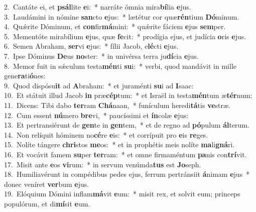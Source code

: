 {2.~}Cantáte ei, et \textbf{psál}lite \textbf{e}i:~* narráte ómnia mira\textbf{bí}lia \textbf{e}jus.\\
{3.~}Laudámini in nómine \textbf{san}cto \textbf{e}jus:~* lætétur cor quæ\textbf{rén}tium \textbf{Dó}minum.\\
{4.~}Quǽrite Dóminum, et \textbf{con}fir\textbf{má}mini:~* quǽrite fáciem \textbf{e}jus \textbf{sem}per.\\
{5.~}Mementóte mirabílium \textbf{e}jus, quæ \textbf{fe}cit:~* prodígia ejus, et judícia \textbf{o}ris \textbf{e}jus.\\
{6.~}Semen Abraham, \textbf{ser}vi \textbf{e}jus:~* fílii Jacob, e\textbf{lé}cti \textbf{e}jus.\\
{7.~}Ipse Dóminus \textbf{De}us \textbf{no}ster:~* in univérsa terra ju\textbf{dí}cia \textbf{e}jus.\\
{8.~}Memor fuit in sǽculum testa\textbf{mén}ti \textbf{su}i:~* verbi, quod mandávit in mille gene\textbf{ra}ti\textbf{ó}nes:\\
{9.~}Quod dispósu\textbf{it} ad \textbf{A}braham:~* et juraménti \textbf{su}i ad \textbf{I}saac:\\
{10.~}Et státuit illud Jacob \textbf{in} præ\textbf{cép}tum:~* et Israël in testa\textbf{mén}tum æ\textbf{tér}num:\\
{11.~}Dicens: Tibi dabo \textbf{ter}ram \textbf{Chá}naan,~* funículum heredi\textbf{tá}tis \textbf{ve}stræ.\\
{12.~}Cum essent \textbf{nú}mero \textbf{bre}vi,~* paucíssimi et \textbf{ín}colæ \textbf{e}jus:\\
{13.~}Et pertransiérunt de \textbf{gen}te in \textbf{gen}tem,~* et de regno ad \textbf{pó}pulum \textbf{ál}terum.\\
{14.~}Non relíquit hóminem no\textbf{cé}re \textbf{e}is:~* et corrípuit pro \textbf{e}is \textbf{re}ges.\\
{15.~}Nolíte tángere \textbf{chri}stos \textbf{me}os:~* et in prophétis meis nolíte \textbf{ma}li\textbf{gná}ri.\\
{16.~}Et vocávit famem \textbf{su}per \textbf{ter}ram:~* et omne firmaméntum \textbf{pa}nis con\textbf{trí}vit.\\
{17.~}Misit ante \textbf{e}os \textbf{vi}rum:~* in servum venúmda\textbf{tus} est \textbf{Jo}seph.\\
{18.~}Humiliavérunt in compédibus pedes ejus, ferrum pertránsiit \textbf{á}nimam \textbf{e}jus~* donec veníret \textbf{ver}bum \textbf{e}jus.\\
{19.~}Elóquium Dómini inflam\textbf{má}vit \textbf{e}um:~* misit rex, et solvit eum; princeps populórum, et di\textbf{mí}sit \textbf{e}um.\\
